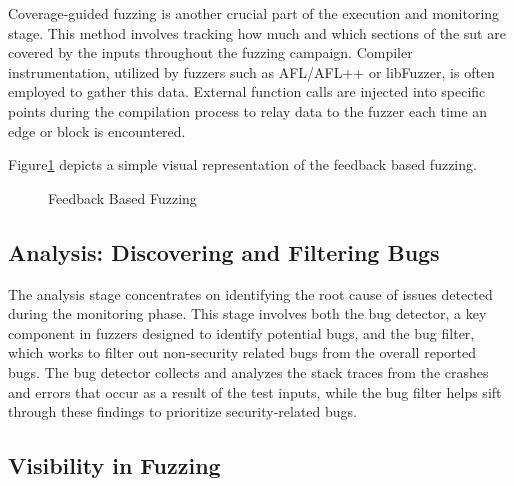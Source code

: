 Coverage-guided fuzzing\cite{jaaskela2016genetic} is another crucial part of
the execution and monitoring stage. This method involves tracking how much and
which sections of the \acrshort{sut} are covered by the inputs throughout the
fuzzing campaign. Compiler instrumentation, utilized by fuzzers such as
AFL/AFL++\cite{257204} or libFuzzer\cite{libFuzze17:online}, is often
employed to gather this data. External function calls are injected into
specific points during the compilation process to relay data to the fuzzer each
time an edge or block is encountered\cite{libFuzze17:online}\cite{bohme2016coverage}\cite{257204}.

Figure\ref{fig:feedback-based-fuzzing} depicts a simple visual representation of the
feedback based fuzzing.


\begin{figure}[h]
        \centering
        \caption{Feedback Based Fuzzing\cite{TheMagic36:online}\cite{LucianoR49:online}}\label{fig:feedback-based-fuzzing}
\end{figure}

\subsection{Analysis: Discovering and Filtering Bugs}
The analysis stage concentrates on identifying the root cause of issues
detected during the monitoring phase. This stage involves both the bug
detector\cite{liang2018fuzzing}\cite{bekrar2012taint}, a key component in fuzzers
designed to identify potential bugs,
and the bug filter\cite{peng2018t}\cite{bekrar2012taint}\cite{chen2013taming},
which works to filter out non-security related bugs
from the overall reported bugs. The bug detector collects and analyzes the
stack traces from the crashes and errors that occur as a result of the test
inputs, while the bug filter helps sift through these findings to prioritize
security-related bugs.

\subsection{Visibility in Fuzzing}

